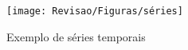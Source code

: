 \begin{figure}[H]
	\centering
	\caption{Exemplo de séries temporais}
	\label{fig:series}
	\texttt{[image: Revisao/Figuras/séries]}
	
\end{figure}
